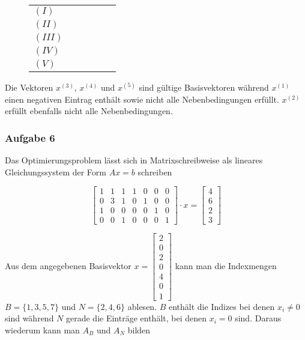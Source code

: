 \documentclass[a4paper, 12pt]{report}
\newcommand{\cmark}{\ding{51}}%
\newcommand{\xmark}{\ding{55}}%
\begin{document}
\begin{figure}[H]
\begin{tabular}{l|c c c c c}
    \hline
    $(I)$ & \xmark & \cmark & \cmark & \cmark & \cmark \\
    $(II)$ & \cmark & \xmark & \cmark & \cmark & \cmark \\
    $(III)$ & \cmark & \xmark & \cmark & \cmark & \cmark \\
    $(IV)$ & \cmark & \cmark & \cmark & \cmark & \cmark \\
    $(V)$ & \xmark & \cmark & \cmark & \cmark & \cmark \\
  \end{tabular}
\end{figure}

Die Vektoren $x^{(3)}$, $x^{(4)}$ und $x^{(5)}$ sind gültige Basisvektoren während $x^{(1)}$ einen negativen Eintrag enthält
sowie nicht alle Nebenbedingungen erfüllt. $x^{(2)}$ erfüllt ebenfalls nicht alle Nebenbedingungen.

\subsubsection{Aufgabe 6}

Das Optimierungsproblem lässt sich in Matrixschreibweise als lineares Gleichungssystem der Form $Ax = b$ schreiben

$$ \begin{bmatrix}1 & 1 & 1 & 1 & 0 & 0 & 0\\0 & 3 & 1 & 0 & 1 & 0 & 0\\1 & 0 & 0 & 0 & 0 & 1 & 0\\0 & 0 & 1 & 0 & 0 & 0 & 1\end{bmatrix} \cdot x = \begin{bmatrix}4\\6\\2\\3\end{bmatrix} $$

Aus dem angegebenen Basisvektor $x = \begin{bmatrix}2\\0\\2\\0\\4\\0\\1\end{bmatrix}$ kann man die Indexmengen
$B = \{1, 3, 5, 7\}$ und $N = \{2, 4, 6\}$ ablesen. $B$ enthält die Indizes bei denen $x_i \neq 0$ sind
während $N$ gerade die Einträge enthält, bei denen $x_i = 0$ sind. Daraus wiederum kann man $A_B$ und $A_N$ bilden
\end{document}
